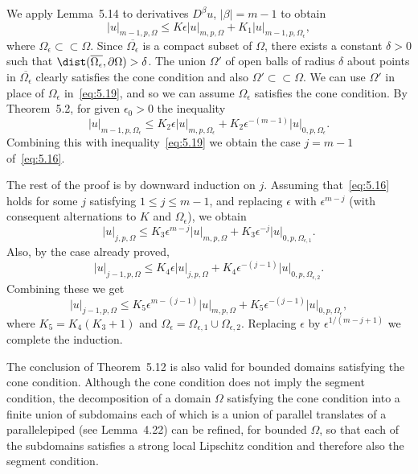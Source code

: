 \begin{para}
  We apply Lemma~5.14 to derivatives $D^\beta u$, $|\beta|=m-1$ to obtain
  \begin{equation}\label{eq:5.19}
    |u|_{m-1,p,\Omega} \leq K\epsilon |u|_{m,p,\Omega} + K_1 |u|_{m-1,p,\Omega_\epsilon},
  \end{equation}
  where $\Omega_{\epsilon}\subset\subset\Omega$. Since $\overline{\Omega_{\epsilon}}$
  is a compact subset of $\Omega$, there exists a constant $\delta>0$ such that
  $\dist(\overline{\Omega_{\epsilon}}, \partial\Omega) > \delta$. The union $\Omega'$
  of open balls of radius $\delta$ about points in $\overline{\Omega_{\epsilon}}$
  clearly satisfies the cone condition and also $\Omega'\subset\subset\Omega$. We can
  use $\Omega'$ in place of $\Omega_{\epsilon}$ in~\eqref{eq:5.19}, and so we can
  assume $\Omega_{\epsilon}$ satisfies the cone condition. By Theorem~5.2, for given
  $\epsilon_0>0$ the inequality
  \[ |u|_{m-1,p,\Omega_{\epsilon}} \leq K_2 \epsilon |u|_{m,p,\Omega_{\epsilon}}
      + K_2 \epsilon^{-(m-1)} |u|_{0,p,\Omega_{\epsilon}}. \]
  Combining this with inequality~\eqref{eq:5.19} we obtain the case $j=m-1$
  of~\eqref{eq:5.16}.

  The rest of the proof is by downward induction on $j$. Assuming that~\eqref{eq:5.16}
  holds for some $j$ satisfying $1\leq j\leq m-1$, and replacing $\epsilon$
  with $\epsilon^{m-j}$ (with consequent alternations to $K$ and $\Omega_\epsilon$),
  we obtain
  \[ |u|_{j,p,\Omega} \leq K_3 \epsilon^{m-j} |u|_{m,p,\Omega} 
      + K_3 \epsilon^{-j} |u|_{0,p,\Omega_{\epsilon,1}}. \]
  Also, by the case already proved,
  \[ |u|_{j-1,p,\Omega} \leq K_4 \epsilon |u|_{j,p,\Omega}
      + K_4 \epsilon^{-(j-1)} |u|_{0,p,\Omega_{\epsilon,2}}. \]
  Combining these we get
  \[ |u|_{j-1,p,\Omega} \leq K_5 \epsilon^{m-(j-1)} |u|_{m,p,\Omega}
      + K_5 \epsilon^{-(j-1)} |u|_{0,p,\Omega_{\epsilon}}, \]
  where $K_5 = K_4(K_3+1)$ and $\Omega_{\epsilon} = \Omega_{\epsilon,1} \cup \Omega_{\epsilon,2}$.
  Replacing $\epsilon$ by $\epsilon^{1/(m-j+1)}$ we complete the induction.
\end{para}


\begin{remark}
  The conclusion of Theorem~5.12 is also valid for bounded domains satisfying
  the cone condition. Although the cone condition does not imply the segment
  condition, the decomposition of a domain $\Omega$ satisfying the cone condition
  into a finite union of subdomains each of which is a union of parallel
  translates of a parallelepiped (see Lemma~4.22) can be refined, for bounded
  $\Omega$, so that each of the subdomains satisfies a strong local Lipschitz
  condition and therefore also the segment condition.
\end{remark}


